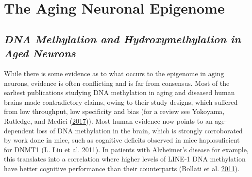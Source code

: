 \documentclass[onehalf,12pt]{beavtex}
\begin{document}
  \section{The Aging Neuronal
  Epigenome}\label{the-aging-neuronal-epigenome}
  
  \subsection{\texorpdfstring{\emph{DNA Methylation and Hydroxymethylation
  in Aged
  Neurons}}{DNA Methylation and Hydroxymethylation in Aged Neurons}}\label{DNAging}
  
  While there is some evidence as to what occurs to the epigenome in aging
  neurons, evidence is often conflicting and is far from consensus. Most
  of the earliest publications studying DNA methylation in aging and
  diseased human brains made contradictory claims, owing to their study
  designs, which suffered from low throughput, low specificity and bias
  (for a review see Yokoyama, Rutledge, and Medici
  (\protect\hyperlink{ref-YokoyamaDNAmethylationalterations2017}{2017})).
  Most human evidence now points to an age-dependent loss of DNA
  methylation in the brain, which is strongly corroborated by work done in
  mice, such as cognitive deficits observed in mice haplosuficient for
  DNMT1 (L. Liu et al.
  \protect\hyperlink{ref-LiuInsufficientDNAmethylation2011}{2011}). In
  patients with Alzheimer's disease for example, this translates into a
  correlation where higher levels of LINE-1 DNA methylation have better
  cognitive performance than their counterparts (Bollati et al.
  \protect\hyperlink{ref-BollatiDNAmethylationrepetitive2011}{2011}).
  
\end{document}
